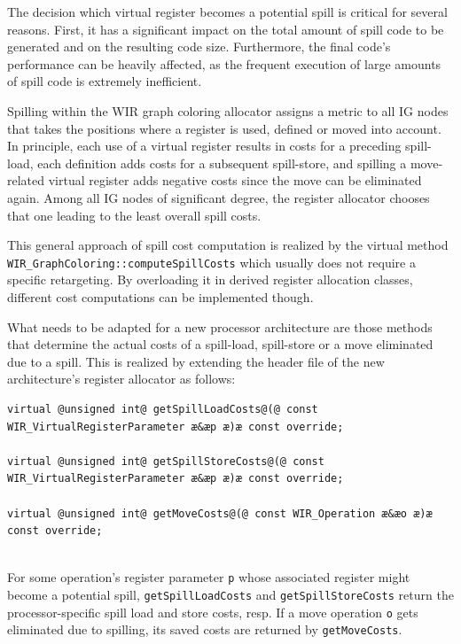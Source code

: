 The decision which virtual register becomes a potential spill is critical for several reasons.
First, it has a significant impact on the total amount of spill code to be generated and on the resulting code size.
Furthermore, the final code's performance can be heavily affected, as the frequent execution of large amounts of spill code is extremely inefficient.

Spilling within the \gls{WIR} graph coloring allocator assigns a metric to all \gls{IG} nodes that takes the positions where a register is used, defined or moved into account.
In principle, each use of a virtual register results in costs for a preceding spill-load, each definition adds costs for a subsequent spill-store, and spilling a move-related virtual register adds negative costs since the move can be eliminated again.
Among all \gls{IG} nodes of significant degree, the register allocator chooses that one leading to the least overall spill costs.

This general approach of spill cost computation is realized by the virtual method \texttt{WIR\_GraphColoring::com\-puteSpillCosts} which usually does not require a specific retargeting.
By overloading it in derived register allocation classes, different cost computations can be implemented though.

What needs to be adapted for a new processor architecture are those methods that determine the actual costs of a spill-load, spill-store or a move eliminated due to a spill.
This is realized by extending the header file of the new architecture's register allocator as follows: \\
\begin{lstlisting}[style=code,float=!ht,aboveskip=-0.8 \baselineskip,belowskip=-0.8 \baselineskip]
virtual @unsigned int@ getSpillLoadCosts@(@ const WIR_VirtualRegisterParameter æ&æp æ)æ const override;

virtual @unsigned int@ getSpillStoreCosts@(@ const WIR_VirtualRegisterParameter æ&æp æ)æ const override;

virtual @unsigned int@ getMoveCosts@(@ const WIR_Operation æ&æo æ)æ const override;
\end{lstlisting}
\\
For some operation's register parameter \texttt{p} whose associated register might become a potential spill, \texttt{getSpill\-LoadCosts} and \texttt{getSpillStoreCosts} return the processor-specific spill load and store costs, resp.
If a move operation \texttt{o} gets eliminated due to spilling, its saved costs are returned by \texttt{getMoveCosts}.

